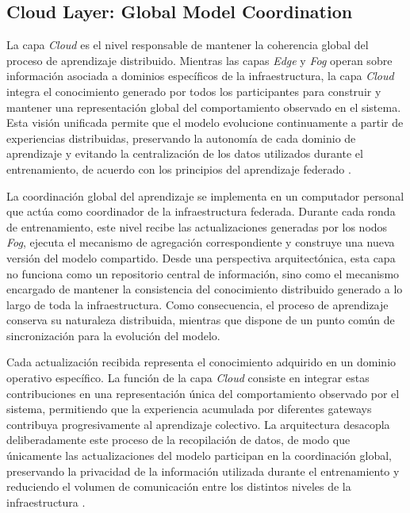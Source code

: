 \documentclass[journal,article,submit,moreauthors]{Definitions/mdpi}
\begin{document}
\subsection{Cloud Layer: Global Model Coordination}
La capa \textit{Cloud} es el nivel responsable de mantener la coherencia global del proceso de aprendizaje distribuido. Mientras las capas \textit{Edge} y \textit{Fog} operan sobre información asociada a dominios específicos de la infraestructura, la capa \textit{Cloud} integra el conocimiento generado por todos los participantes para construir y mantener una representación global del comportamiento observado en el sistema. Esta visión unificada permite que el modelo evolucione continuamente a partir de experiencias distribuidas, preservando la autonomía de cada dominio de aprendizaje y evitando la centralización de los datos utilizados durante el entrenamiento, de acuerdo con los principios del aprendizaje federado \cite{McMahan2017,Imteaj2022,Ramadan2025,Ma2024,Dritsas2025}.

La coordinación global del aprendizaje se implementa en un computador personal que actúa como coordinador de la infraestructura federada. Durante cada ronda de entrenamiento, este nivel recibe las actualizaciones generadas por los nodos \textit{Fog}, ejecuta el mecanismo de agregación correspondiente y construye una nueva versión del modelo compartido. Desde una perspectiva arquitectónica, esta capa no funciona como un repositorio central de información, sino como el mecanismo encargado de mantener la consistencia del conocimiento distribuido generado a lo largo de toda la infraestructura. Como consecuencia, el proceso de aprendizaje conserva su naturaleza distribuida, mientras que dispone de un punto común de sincronización para la evolución del modelo.

Cada actualización recibida representa el conocimiento adquirido en un dominio operativo específico. La función de la capa \textit{Cloud} consiste en integrar estas contribuciones en una representación única del comportamiento observado por el sistema, permitiendo que la experiencia acumulada por diferentes gateways contribuya progresivamente al aprendizaje colectivo. La arquitectura desacopla deliberadamente este proceso de la recopilación de datos, de modo que únicamente las actualizaciones del modelo participan en la coordinación global, preservando la privacidad de la información utilizada durante el entrenamiento y reduciendo el volumen de comunicación entre los distintos niveles de la infraestructura \cite{Hajj2023,Ficco2024,Ma2024,Cooray2025}.
\end{document}

